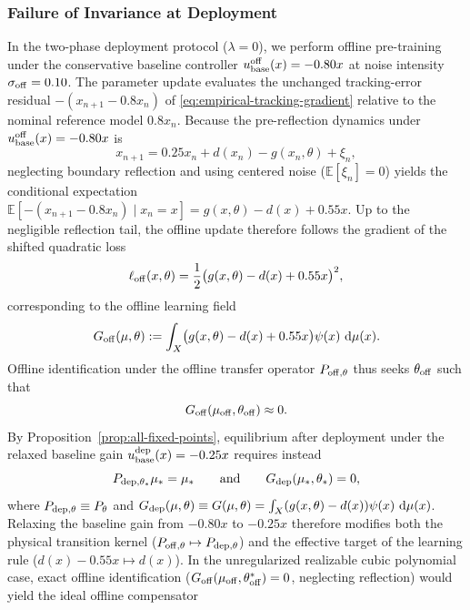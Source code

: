 \subsubsection{Failure of Invariance at Deployment}
\label{sec:deployment-invariance-failure}
In the two-phase deployment protocol ($\lambda=0$), we perform offline pre-training under the conservative baseline controller $u_{\rm base}^{\rm off}(x) = -0.80x$ at noise intensity $\sigma_{\rm off}=0.10$. The parameter update evaluates the unchanged tracking-error residual $-(x_{n+1}-0.8x_n)$ of \eqref{eq:empirical-tracking-gradient} relative to the nominal reference model $0.8x_n$. Because the pre-reflection dynamics under $u_{\rm base}^{\rm off}(x)=-0.80x$ is
\[
    x_{n+1} = 0.25x_n + d(x_n) - g(x_n,\theta) + \xi_n,
\]
neglecting boundary reflection and using centered noise ($\mathbb{E}[\xi_n]=0$) yields the conditional expectation $\mathbb{E}[-(x_{n+1}-0.8x_n)\mid x_n=x] = g(x,\theta) - d(x) + 0.55x$. Up to the negligible reflection tail, the offline update therefore follows the gradient of the shifted quadratic loss
\[
    \ell_{\rm off}(x,\theta) = \frac{1}{2}\bigl(g(x,\theta) - d(x) + 0.55x\bigr)^2,
\]
corresponding to the offline learning field
\begin{equation}
    G_{\rm off}(\mu,\theta) := \int_X \bigl(g(x,\theta) - d(x) + 0.55x\bigr)\psi(x)\,\,\mathrm{d}\mu(x).
    \label{eq:offline-learning-field}
\end{equation}
Offline identification under the offline transfer operator $P_{\rm off,\theta}$ thus seeks $\theta_{\rm off}$ such that
\begin{equation}
    G_{\rm off}(\mu_{\rm off}, \theta_{\rm off}) \approx 0.
\end{equation}
By Proposition~\ref{prop:all-fixed-points}, equilibrium after deployment under the relaxed baseline gain $u_{\rm base}^{\rm dep}(x) = -0.25x$ requires instead
\begin{equation}
    P_{\rm dep,\theta_*}\mu_* = \mu_* \qquad \text{and} \qquad G_{\rm dep}(\mu_*,\theta_*) = 0,
\end{equation}
where $P_{\rm dep,\theta} \equiv P_\theta$ and $G_{\rm dep}(\mu,\theta) \equiv G(\mu,\theta) = \int_X (g(x,\theta)-d(x))\psi(x)\,\,\mathrm{d}\mu(x)$. Relaxing the baseline gain from $-0.80x$ to $-0.25x$ therefore modifies both the physical transition kernel ($P_{\rm off,\theta}\mapsto P_{\rm dep,\theta}$) and the effective target of the learning rule ($d(x)-0.55x \mapsto d(x)$). In the unregularized realizable cubic polynomial case, exact offline identification ($G_{\rm off}(\mu_{\rm off},\theta_{\rm off}^*)=0$, neglecting reflection) would yield the ideal offline compensator
